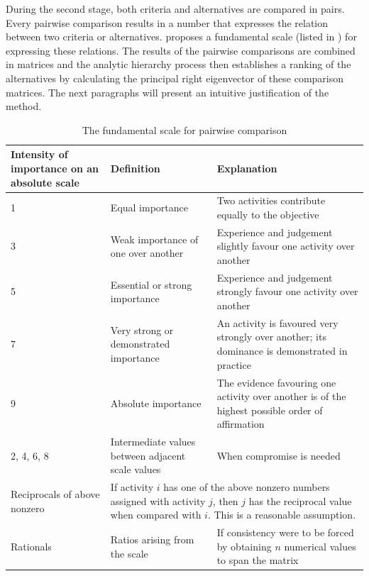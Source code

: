 During the second stage, both criteria and alternatives are compared in pairs. Every pairwise comparison results in a number that expresses the relation between two criteria or alternatives. \citet{Saaty:1990} proposes a fundamental scale (listed in ) for expressing these relations. The results of the pairwise comparisons are combined in matrices and the analytic hierarchy process then establishes a ranking of the alternatives by calculating the principal right eigenvector of these comparison matrices. The next paragraphs will present an intuitive justification of the method.

\begin{table}
    \begin{center}
        \begin{tabular}{p{2.5cm}p{4cm}p{6cm}}
            \hline
            Intensity of importance on an absolute scale & Definition & Explanation \\
            \hline
            1 & Equal importance & Two activities contribute equally to the objective \\
            3 & Weak importance of one over another & Experience and judgement slightly favour one activity over another \\
            5 & Essential or strong importance & Experience and judgement strongly favour one activity over another \\
            7 & Very strong or demonstrated importance & An activity is favoured very strongly over another; its dominance is  demonstrated in practice \\
            9 & Absolute importance & The evidence favouring one activity over another is of the highest possible order of affirmation \\
            2, 4, 6, 8 & Intermediate values between adjacent scale values & When compromise is needed \\
            Reciprocals of above nonzero & \multicolumn{2}{p{10cm}}{If activity $i$ has one of the above nonzero numbers assigned with activity $j$, then $j$ has the reciprocal value when compared with $i$. This is a reasonable assumption.} \\
            Rationals & Ratios arising from the scale & If consistency were to be forced by obtaining $n$ numerical values to span the matrix \\
            \hline
        \end{tabular}
        \caption{The fundamental scale for pairwise comparison\cite{Saaty:1990}}
        \label{tab:ahp-scale}
    \end{center}
\end{table}

